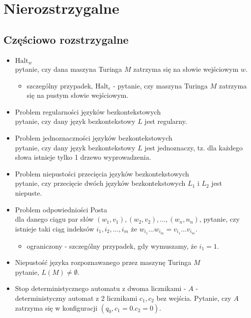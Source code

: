\documentclass{article}
\theoremstyle{definition}
\theoremstyle{remark}
\begin{document}
\newpage

\section {Nierozstrzygalne}
\subsection{Częściowo rozstrzygalne}
\begin{itemize}
    \item $\text{Halt}_w$ \\ 
    pytanie, czy dana maszyna Turinga $M$ zatrzyma się na słowie wejściowym $w$. 
    
    \begin{itemize}
    \item szczególny przypadek, $\text{Halt}_{\epsilon}$ - pytanie, czy maszyna Turinga $M$ zatrzyma się na pustym słowie wejściowym.
    \end{itemize}

    \newpage
    
    \item Problem regularności języków bezkontekstowych \\ 
    pytanie, czy dany język bezkontekstowy $L$ jest regularny.
    
    \item Problem jednoznaczności języków bezkontekstowych \\
    pytanie, czy dany język bezkontekstowy $L$ jest jednoznaczy, tz. dla każdego słowa istnieje tylko 1 drzewo wyprowadzenia.
    
    \item Problem niepustości przecięcia języków bezkontekstowych \\
    pytanie, czy przecięcie dwóch języków bezkontekstowych $L_1$ i $L_2$ jest niepuste.
    
    \item Problem odpowiedniości Posta\\
    dla danego ciągu par słów $(w_1, v_1), (w_2, v_2), \ldots, (w_n, n_n)$, pytanie, czy istnieje taki ciąg indeksów $i_1, i_2, \ldots, i_m$ że $ w_{i_1} \ldots w_{i_m} = v_{i_1} \ldots v_{i_m}$.
    
    \begin{itemize}
        \item ograniczony - szczególny przypadek, gdy wymuszamy, że $i_1=1$.
    \end{itemize}

    \item Niepustość języka rozpoznawanego przez maszynę Turinga $M$ \\
    pytanie, $L(M) \neq \emptyset$.
    
    \item Stop deterministycznego automatu z dwoma licznikami - $A$ - deterministyczny automat z 2 licznikami $c_1, c_2$ bez wejścia. Pytanie, czy $A$ zatrzyma się w konfiguracji $(q_0, c_1 = 0. c_2=0)$.
\end{itemize}
\end{document}
